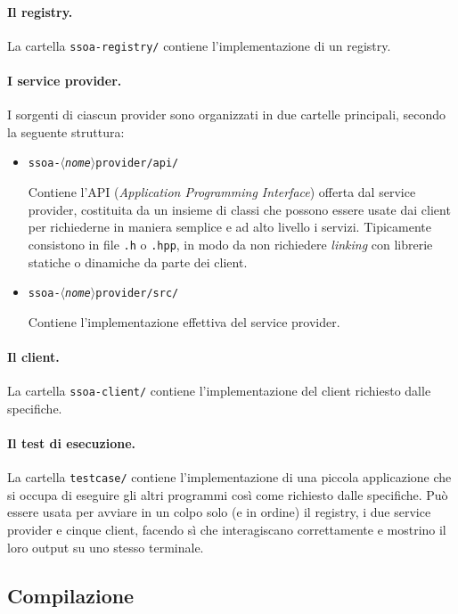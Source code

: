 \documentclass[a4paper,twoside]{article}
\newcommand*\file{\texttt}
\newcommand*\meta[1]{$\langle$\emph{#1}$\rangle$}
\begin{document}
\paragraph{Il registry.}
La cartella \file{ssoa-registry/} contiene l'implementazione di un registry.

\paragraph{I service provider.}
I sorgenti di ciascun provider sono organizzati in due cartelle principali, secondo la seguente struttura:
\begin{itemize}
\item \file{ssoa-\meta{nome}provider/api/}\par
Contiene l'API (\emph{Application Programming Interface}) offerta dal service provider, costituita da un insieme di classi che possono essere usate dai client per richiederne in maniera semplice e ad alto livello i servizi. Tipicamente consistono in file \file{.h} o \file{.hpp}, in modo da non richiedere \emph{linking} con librerie statiche o dinamiche da parte dei client.
\item \file{ssoa-\meta{nome}provider/src/}\par
Contiene l'implementazione effettiva del service provider.
\end{itemize}

\paragraph{Il client.}
La cartella \file{ssoa-client/} contiene l'implementazione del client richiesto dalle specifiche.

\paragraph{Il test di esecuzione.}
La cartella \file{testcase/} contiene l'implementazione di una piccola applicazione che si occupa di eseguire gli altri programmi così come richiesto dalle specifiche. Può essere usata per avviare in un colpo solo (e in ordine) il registry, i due service provider e cinque client, facendo sì che interagiscano correttamente e mostrino il loro output su uno stesso terminale.


\subsection{Compilazione}
\end{document}
